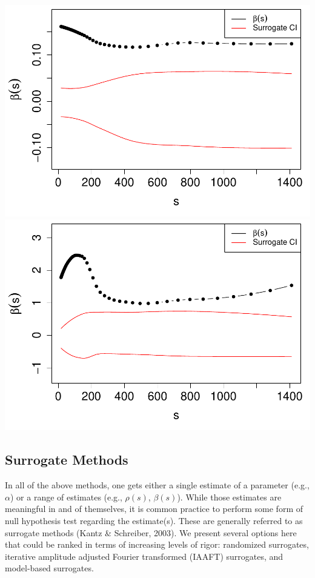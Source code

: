 \documentclass[
  man]{apa6}
\begin{document}
\includegraphics{fractal_regression_paper_brm_files/figure-latex/unnamed-chunk-26-1.pdf} \includegraphics{fractal_regression_paper_brm_files/figure-latex/unnamed-chunk-26-2.pdf}

\hypertarget{surrogate-methods}{%
\subsection{Surrogate Methods}\label{surrogate-methods}}

In all of the above methods, one gets either a single estimate of a
parameter (e.g., \(\alpha\)) or a range of estimates (e.g., \(\rho(s)\),
\(\beta(s)\)). While those estimates are meaningful in and of themselves,
it is common practice to perform some form of null hypothesis test
regarding the estimate(s). These are generally referred to as surrogate
methods (Kantz \& Schreiber, 2003). We present several options here that could be
ranked in terms of increasing levels of rigor: randomized surrogates,
iterative amplitude adjusted Fourier transformed (IAAFT) surrogates, and
model-based surrogates.
\end{document}
